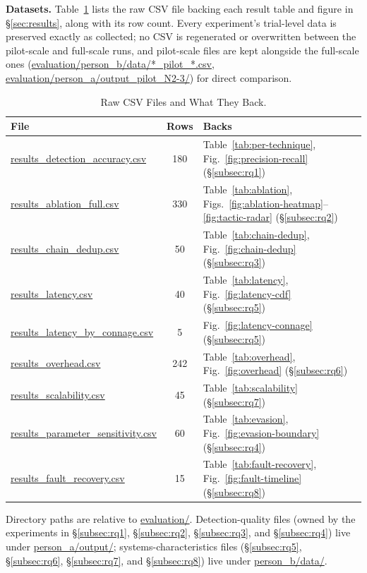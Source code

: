 \documentclass{ieeeaccess}
\begin{document}
\textbf{Datasets.} Table~\ref{tab:artifacts} lists the raw CSV file backing each result
table and figure in \S\ref{sec:results}, along with its row count. Every experiment's
trial-level data is preserved exactly as collected; no CSV is
regenerated or overwritten between the pilot-scale and full-scale
runs, and pilot-scale files are kept alongside the full-scale ones
(\url{evaluation/person_b/data/*_pilot_*.csv},
\url{evaluation/person_a/output_pilot_N2-3/}) for direct comparison.

\begin{table}[!t]
\centering
\caption{Raw CSV Files and What They Back.}
\label{tab:artifacts}
\tablebodyfont
\setlength{\tabcolsep}{2.5pt}
\begin{tabular}{@{}>{\raggedright\arraybackslash}p{}c>{\raggedright\arraybackslash}p{}@{}}
\toprule
\textbf{File} & \textbf{Rows} & \textbf{Backs} \\
\midrule
\url{results_detection_accuracy.csv} & 180 & Table~\ref{tab:per-technique}, Fig.~\ref{fig:precision-recall} (\S\ref{subsec:rq1}) \\
\url{results_ablation_full.csv} & 330 & Table~\ref{tab:ablation}, Figs.~\ref{fig:ablation-heatmap}--\ref{fig:tactic-radar} (\S\ref{subsec:rq2}) \\
\url{results_chain_dedup.csv} & 50 & Table~\ref{tab:chain-dedup}, Fig.~\ref{fig:chain-dedup} (\S\ref{subsec:rq3}) \\
\url{results_latency.csv} & 40 & Table~\ref{tab:latency}, Fig.~\ref{fig:latency-cdf} (\S\ref{subsec:rq5}) \\
\url{results_latency_by_connage.csv} & 5 & Fig.~\ref{fig:latency-connage} (\S\ref{subsec:rq5}) \\
\url{results_overhead.csv} & 242 & Table~\ref{tab:overhead}, Fig.~\ref{fig:overhead} (\S\ref{subsec:rq6}) \\
\url{results_scalability.csv} & 45 & Table~\ref{tab:scalability} (\S\ref{subsec:rq7}) \\
\url{results_parameter_sensitivity.csv} & 60 & Table~\ref{tab:evasion}, Fig.~\ref{fig:evasion-boundary} (\S\ref{subsec:rq4}) \\
\url{results_fault_recovery.csv} & 15 & Table~\ref{tab:fault-recovery}, Fig.~\ref{fig:fault-timeline} (\S\ref{subsec:rq8}) \\
\bottomrule
\end{tabular}
\end{table}

Directory paths are relative to \url{evaluation/}. Detection-quality files
(owned by the experiments in \S\ref{subsec:rq1}, \S\ref{subsec:rq2}, \S\ref{subsec:rq3}, and \S\ref{subsec:rq4}) live under
\url{person_a/output/}; systems-characteristics files (\S\ref{subsec:rq5}, \S\ref{subsec:rq6}, \S\ref{subsec:rq7},
and \S\ref{subsec:rq8}) live under \url{person_b/data/}.
\end{document}
